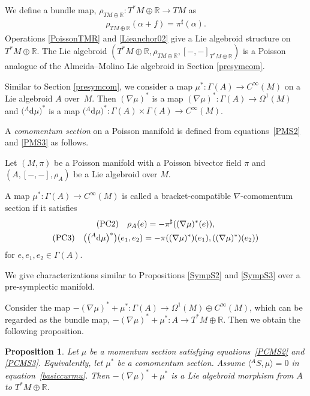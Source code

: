 \documentclass[10pt,a4paper]{amsart}
\numberwithin{equation}{section}
\newtheorem{Proposition}[Theorem]{Proposition}
 { \theoremstyle{definition}
\newtheorem{Definition}[Theorem]{Definition}
\newtheorem{Note}[Theorem]{Note}
\newtheorem{Example}[Theorem]{Example}
\newtheorem{Remark}[Theorem]{Remark}
\newtheorem{Question}[Theorem]{Question}
 }
\def\bR{{\mathbb{R}}}
\newcommand{\rhoa}{{\rho_A}}
\newcommand{\rhotr}{\rho_{TM \oplus \bR}}
\newcommand{\rd}{\mathrm{d}}
\begin{document}
We define a bundle map,
$\rhotr\colon T^*M \oplus \bR \rightarrow TM$ as
\begin{gather}
\rhotr(\alpha + f) = \pi^{\sharp} (\alpha).
\label{Lieanchor02}
\end{gather}
Operations \eqref{PoissonTMR} and \eqref{Lieanchor02} give a Lie algebroid
structure on $T^*M \oplus \bR$.
The Lie algebroid $(T^*M \oplus \bR, \rhotr, [-,-]_{T^*M \oplus \bR})$
is a Poisson analogue of the Almeida--Molino Lie algebroid in Section
\ref{presymcom}.

Similar to Section \ref{presymcom}, we consider a map
$\mu^*\colon\Gamma(A) \rightarrow C^{\infty}(M)$ on
a Lie algebroid $A$ over~$M$.
Then $(\nabla \mu)^*$ is a map
$(\nabla \mu)^*\colon \Gamma(A) \rightarrow \Omega^1(M)$
and $\bigl({}^A \rd \mu\bigr)^*$ is a map
$\bigl({}^A \rd \mu\bigr)^*\colon \Gamma(A) \times \Gamma(A) \rightarrow C^{\infty}(M)$.

A \textit{comomentum section} on a Poisson manifold is defined from
equations~\eqref{PMS2} and \eqref{PMS3} as follows.
\begin{Definition}\label{comomPois}
Let $(M, \pi)$ be a Poisson manifold with a Poisson bivector field $\pi$
and $(A, [-,-], \rhoa)$ be a Lie algebroid over $M$.

A map $\mu^*\colon \Gamma(A) \rightarrow C^{\infty}(M)$ is called a bracket-compatible $\nabla$-comomentum section if it satisfies
\begin{gather}
{\rm (PC2)} \quad
 \rhoa(e) = - \pi^{\sharp} ((\nabla \mu)^*(e)),
\label{PCMS2}
\\
{\rm (PC3)} \quad \bigl(\bigl({}^A \rd \mu\bigr)^*\bigr) (e_1, e_2) = - \pi((\nabla \mu)^*)(e_1), ((\nabla \mu)^*)(e_2))
\label{PCMS3}
\end{gather}
for $e, e_1, e_2 \in \Gamma(A)$.
\end{Definition}


We give characterizations similar to Propositions \ref{SympS2} and \ref{SympS3}
over a pre-symplectic manifold.


Consider the map
$-(\nabla \mu)^* + \mu^*\colon \Gamma(A) \rightarrow \Omega^1(M) \oplus C^{\infty}(M)$,
which can be regarded as the bundle map,
$- (\nabla \mu)^* + \mu^*\colon A \rightarrow T^*M \oplus \bR$.
Then we obtain the following proposition.
\begin{Proposition}\label{PoisP3}
Let $\mu$ be a momentum section satisfying equations~\eqref{PCMS2} and \eqref{PCMS3}. Equivalently, let $\mu^*$ be a comomentum section.
Assume $\bigl\langle {}^A S,\mu\bigr\rangle = 0$ in equation~\eqref{basiccurmu}.
Then $-(\nabla \mu)^* + \mu^*$ is a Lie algebroid morphism
from $A$ to $T^*M \oplus \bR$.
\end{Proposition}
\end{document}
